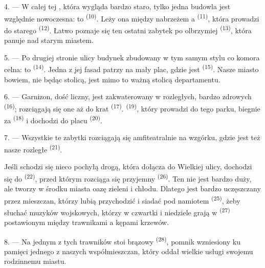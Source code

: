 4. --- W całej tej , która wygląda bardzo staro, tylko jedna budowla
jest względnie nowoczesna: to  \textsuperscript{(10)}. Leży ona
między nabrzeżem a  \textsuperscript{(11)}, która prowadzi do starego
 \textsuperscript{(12)}. Łatwo poznaje się ten ostatni zabytek po
olbrzymiej  \textsuperscript{(13)}, która panuje nad starym miastem.

5. --- Po drugiej stronie ulicy  budynek zbudowany w tym samym stylu co
komora celna: to  \textsuperscript{(14)}. Jedna z jej fasad patrzy na mały
plac, gdzie jest  \textsuperscript{(15)}. Nasze miasto bowiem, nie
będąc stolicą, jest mimo to ważną stolicą departamentu.

\VUsaut{5.0mm}
\VUsaut{3.4mm}

6. --- Garnizon, dość liczny, jest zakwaterowany w rozległych, bardzo zdrowych
 \textsuperscript{(16)}; rozciągają się one aż do krat  \textsuperscript{(17)}.  \textsuperscript{(19)}, który
prowadzi do tego parku, biegnie za  \textsuperscript{(18)} i
dochodzi do placu  \textsuperscript{(20)}.

7. --- Wszystkie te zabytki rozciągają się amfiteatralnie na wzgórku, gdzie jest też
nasze rozległe  \textsuperscript{(21)}.

Jeśli schodzi się nieco pochyłą drogą, która dołącza do Wielkiej ulicy, dochodzi się do
 \textsuperscript{(22)}, przed którym rozciąga się przyjemny  \textsuperscript{(26)}. Ten  nie jest bardzo duży, ale tworzy w
środku miasta oazę zieleni i chłodu. Dlatego jest bardzo uczęszczany przez mieszczan,
którzy lubią przychodzić i siadać pod namiotem 
\textsuperscript{(25)}, żeby słuchać muzyków wojskowych, którzy w czwartki i niedziele
grają w  \textsuperscript{(27)} postawionym między trawnikami a kępami
krzewów.

8. --- Na jednym z tych trawników stoi brązowy  \textsuperscript{(28)},
pomnik wzniesiony ku pamięci jednego z naszych współmieszczan, który oddał wielkie
usługi swojemu rodzinnemu miastu.

\VUsaut{4.0mm}
\VUsaut{3.4mm}


